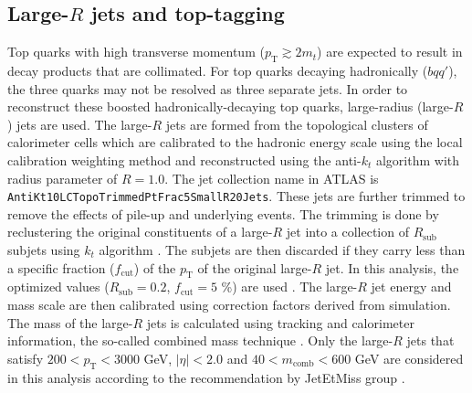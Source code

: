 \subsection{Large-$R$ jets and top-tagging}
\label{subsec:LargeJets}
Top quarks with high transverse momentum ($p_\text{T}\gtrsim2m_{t}$) are expected to result in decay products that are collimated. For top quarks decaying hadronically ($bqq'$), the three quarks may not be resolved as three separate jets. In order to reconstruct these boosted hadronically-decaying top quarks, large-radius (large-$R$) jets are used. The large-$R$ jets are formed from the topological clusters of calorimeter cells which are calibrated to the hadronic energy scale using the local calibration weighting method \cite{PERF-2014-07} and reconstructed using the anti-$k_t$ algorithm with radius parameter of $R=1.0$. The jet collection name in ATLAS is \texttt{AntiKt10LCTopoTrimmedPtFrac5SmallR20Jets}. These jets are further trimmed to remove the effects of pile-up and underlying events. The trimming \cite{D.Krohn:2010} is done by reclustering the original constituents of a large-$R$ jet into a collection of $R_\text{sub}$ subjets using $k_t$ algorithm \cite{S.Catani:1993}. The subjets are then discarded if they carry less than a specific fraction ($f_\text{cut}$) of the $p_\text{T}$ of the original large-$R$ jet. In this analysis, the optimized values ($R_\text{sub}=0.2$, $f_\text{cut}=5$ \%) are used \cite{PERF-2015-03}. The large-$R$ jet energy and mass scale are then calibrated using correction factors derived from simulation. The mass of the large-$R$ jets is calculated using tracking and calorimeter information, the so-called combined mass technique \cite{ATLAS-CONF-2016-035}. Only the large-$R$ jets that satisfy $200<p_\text{T}<3000$ GeV, $|\eta|<2.0$ and $40<m_\text{comb}<600$ GeV are considered in this analysis according to the recommendation by JetEtMiss group \cite{TwikiForLargeRJetUncert}.

